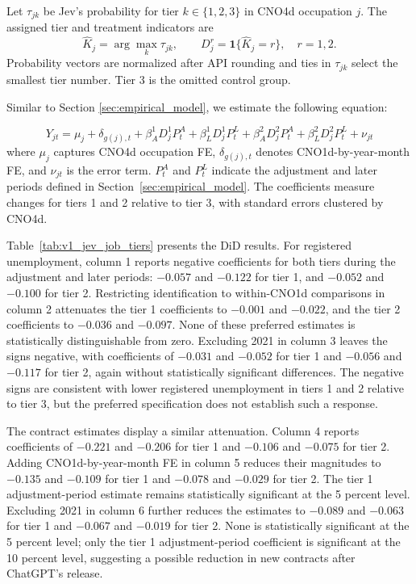 Let $\tau_{jk}$ be Jev's probability for tier $k\in\{1,2,3\}$ in CNO4d occupation $j$. The assigned tier and treatment indicators are
\begin{equation}
\label{eq:v1_jev_tier_assignment}
\widehat K_j=\arg\max_k\tau_{jk},\qquad D_j^r=\mathbf{1}\{\widehat K_j=r\},\quad r=1,2.
\end{equation}
Probability vectors are normalized after API rounding and ties in $\tau_{jk}$ select the smallest tier number. Tier 3 is the omitted control group.

Similar to Section \ref{sec:empirical_model}, we estimate the following equation:

\begin{equation}
Y_{jt}=\mu_j+\delta_{g(j),t}+\beta^1_A D^1_jP^A_t+\beta^1_L D^1_jP^L_t+\beta^2_A D^2_jP^A_t+\beta^2_L D^2_jP^L_t+\nu_{jt}
\label{eq:tier_static}
\end{equation}
where $\mu_j$ captures CNO4d occupation FE, $\delta_{g(j),t}$ denotes CNO1d-by-year-month FE, and $\nu_{jt}$ is the error term. $P^A_t$ and $P^L_t$ indicate the adjustment and later periods defined in Section~\ref{sec:empirical_model}. The coefficients measure changes for tiers 1 and 2 relative to tier 3, with standard errors clustered by CNO4d.

Table~\ref{tab:v1_jev_job_tiers} presents the DiD results. For registered unemployment, column 1 reports negative coefficients for both tiers during the adjustment and later periods: \(-0.057\) and \(-0.122\) for tier 1, and \(-0.052\) and \(-0.100\) for tier 2. Restricting identification to within-CNO1d comparisons in column 2 attenuates the tier 1 coefficients to \(-0.001\) and \(-0.022\), and the tier 2 coefficients to \(-0.036\) and \(-0.097\). None of these preferred estimates is statistically distinguishable from zero. Excluding 2021 in column 3 leaves the signs negative, with coefficients of \(-0.031\) and \(-0.052\) for tier 1 and \(-0.056\) and \(-0.117\) for tier 2, again without statistically significant differences. The negative signs are consistent with lower registered unemployment in tiers 1 and 2 relative to tier 3, but the preferred specification does not establish such a response.

The contract estimates display a similar attenuation. Column 4 reports coefficients of \(-0.221\) and \(-0.206\) for tier 1 and \(-0.106\) and \(-0.075\) for tier 2. Adding CNO1d-by-year-month FE in column 5 reduces their magnitudes to \(-0.135\) and \(-0.109\) for tier 1 and \(-0.078\) and \(-0.029\) for tier 2. The tier 1 adjustment-period estimate remains statistically significant at the 5 percent level. Excluding 2021 in column 6 further reduces the estimates to \(-0.089\) and \(-0.063\) for tier 1 and \(-0.067\) and \(-0.019\) for tier 2. None is statistically significant at the 5 percent level; only the tier 1 adjustment-period coefficient is significant at the 10 percent level, suggesting a possible reduction in new contracts after ChatGPT's release.

